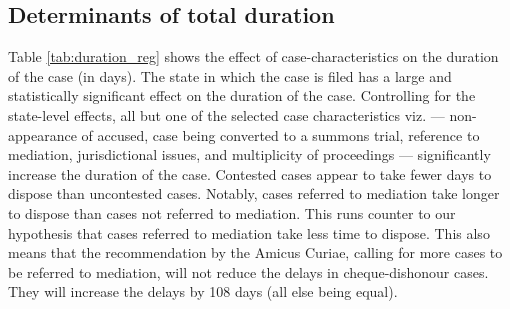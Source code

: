
\subsection{Determinants of total duration}
\label{sec:determ-total-durat}

Table \ref{tab:duration_reg} shows the effect of case-characteristics on the duration of the case (in days). The state in which the case is filed has a large and statistically significant effect on the duration of the case. %
Controlling for the state-level effects, all but one of the selected case characteristics viz. --- non-appearance of accused, case being converted to a summons trial, reference to mediation, jurisdictional issues, and multiplicity of proceedings --- significantly increase the duration of the case. Contested cases appear to take fewer days to dispose than uncontested cases. Notably, cases referred to mediation take longer to dispose than cases not referred to mediation. This runs counter to our hypothesis that cases referred to mediation take less time to dispose. This also means that the recommendation by the Amicus Curiae, calling for more cases to be referred to mediation, will not reduce the delays in cheque-dishonour cases. They will increase the delays by 108 days (all else being equal).

